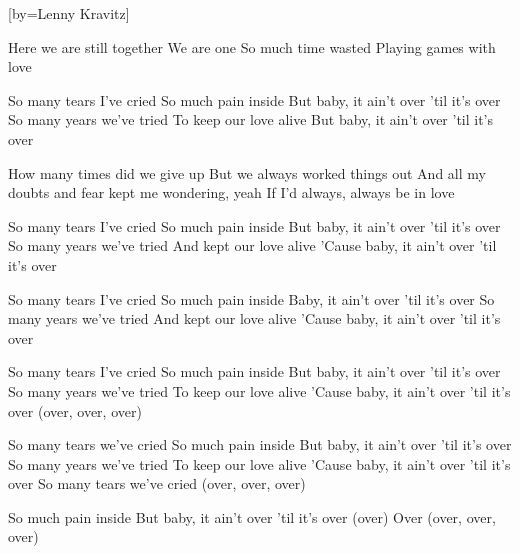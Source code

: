 [by={Lenny Kravitz}]

  \beginverse
  Here we are still together
  We are one
  So much time wasted
  Playing games with love
  \endverse

  \beginverse
  So many tears I've cried
  So much pain inside
  But baby, it ain't over 'til it's over
  So many years we've tried
  To keep our love alive
  But baby, it ain't over 'til it's over
  \endverse

  \beginverse
  How many times did we give up
  But we always worked things out
  And all my doubts and fear kept me wondering, yeah
  If I'd always, always be in love
  \endverse

  \beginverse
  So many tears I've cried
  So much pain inside
  But baby, it ain't over 'til it's over
  So many years we've tried
  And kept our love alive
  'Cause baby, it ain't over 'til it's over
  \endverse

  \beginverse
  So many tears I've cried
  So much pain inside
  Baby, it ain't over 'til it's over
  So many years we've tried
  And kept our love alive
  'Cause baby, it ain't over 'til it's over
  \endverse

  \beginverse
  So many tears I've cried
  So much pain inside
  But baby, it ain't over 'til it's over
  So many years we've tried
  To keep our love alive
  'Cause baby, it ain't over 'til it's over (over, over, over)
  \endverse

  \beginverse
  So many tears we've cried
  So much pain inside
  But baby, it ain't over 'til it's over
  So many years we've tried
  To keep our love alive
  'Cause baby, it ain't over 'til it's over
  So many tears we've cried (over, over, over)
  \endverse

  \beginverse
  So much pain inside
  But baby, it ain't over 'til it's over (over)
  Over (over, over, over)
  \endverse
\endsong
